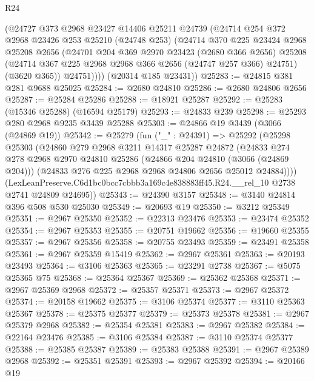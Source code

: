 \begin{lexlean}{R24}
\begin{coremodule}
        (@24727
          @373
          @2968
          @23427
          @14406
          @25211
          @24739
          (@24714
            @254
            @372
            @2968
            @23426
            @253
            @25210
            (@24748 @253)
            (@24714
              @370
              @225
              @23424
              @2968
              @25208
              @2656
              (@24701
                @204
                @369
                @2970
                @23423
                (@2680 @366 @2656)
                @25208
                (@24714 @367 @225 @2968 @2968 @366 @2656 (@24747 @257 @366) @24751)
                (@3620 @365))
              @24751))))
      (@20314 @185 @23431))
@25283 := @24815 @381 @281 @9688 @25025
@25284 := @2680 @24810
@25286 := @2680 @24806 @2656
@25287 := @25284 @25286
@25288 := @18921 @25287
@25292 := @25283 (@15346 @25288) (@16594 @25179)
@25293 := @24833 @239
@25298 := @25293 @280 @2968 @9235 @3439 @25288
@25303 := @24866 @19 @3439 (@3066 (@24869 @19))
@25342 := @25279
    (fun ("_" : @24391) =>
    @25292
      (@25298
        @25303
        (@24860
          @279
          @2968
          @3211
          @14317
          @25287
          @24872
          (@24833
            @274
            @278
            @2968
            @2970
            @24810
            @25286
            (@24866 @204 @24810 (@3066 (@24869 @204)))
            (@24833 @276 @225 @2968 @2968 @24806 @2656 @25012 @24884))))
      (LexLeanPreserve.C6d1bc0bcc7cbbb3a169c4e838883ff45.R24.__rel_10 @2738 @2741 @24809 @24695))
@25343 := @24390 @3157
@25348 := @3140 @24814 @396 @508 @530 @25030
@25349 := @20693 @19
@25350 := @3212 @25349
@25351 := @2967 @25350
@25352 := @22313 @23476
@25353 := @23474 @25352
@25354 := @2967 @25353
@25355 := @20751 @19662
@25356 := @19660 @25355
@25357 := @2967 @25356
@25358 := @20755 @23493
@25359 := @23491 @25358
@25361 := @2967 @25359 @15419
@25362 := @2967 @25361
@25363 := @20193 @23493
@25364 := @3106 @25363
@25365 := @23291 @2738
@25367 := @5075 @25365 @75
@25368 := @25364 @25367
@25369 := @25362 @25368
@25371 := @2967 @25369 @2968
@25372 := @25357 @25371
@25373 := @2967 @25372
@25374 := @20158 @19662
@25375 := @3106 @25374
@25377 := @3110 @25363 @25367
@25378 := @25375 @25377
@25379 := @25373 @25378
@25381 := @2967 @25379 @2968
@25382 := @25354 @25381
@25383 := @2967 @25382
@25384 := @22164 @23476
@25385 := @3106 @25384
@25387 := @3110 @25374 @25377
@25388 := @25385 @25387
@25389 := @25383 @25388
@25391 := @2967 @25389 @2968
@25392 := @25351 @25391
@25393 := @2967 @25392
@25394 := @20166 @19

\end{coremodule}
\end{lexlean}

